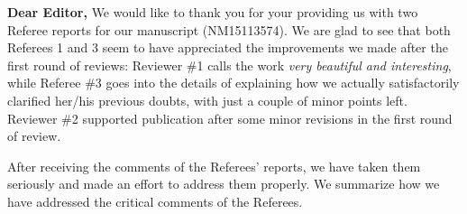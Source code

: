 \documentclass[11pt,a4paper]{article}
\begin{document}




\noindent
{\bf Dear Editor,}
\vskip 0.7cm
We would like to thank you for your providing us with two Referee reports for our manuscript (NM15113574). 
We are glad to see that both Referees 1 and 3 seem to have appreciated the improvements 
we made after the first round of reviews: Reviewer \#1 calls the work \emph{very beautiful and interesting}, while Referee \#3 goes into the details of explaining how we actually satisfactorily clarified her/his previous doubts, with just a couple of minor points left. Reviewer \#2 supported publication after some minor revisions in the first round of review. 

After receiving the comments of the Referees' reports, we have taken them seriously and made an effort to address them properly. 
We summarize how we have addressed the critical comments of the Referees.
\end{document}
